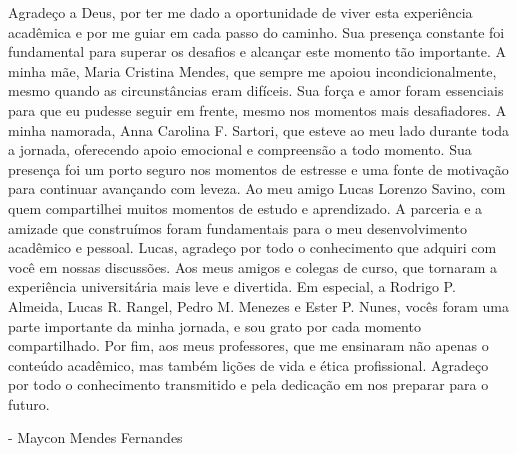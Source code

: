 \begin{agradecimentos}
Agradeço a Deus, por ter me dado a oportunidade de viver esta experiência acadêmica e por me guiar em cada passo do caminho. Sua presença constante foi fundamental para superar os desafios e alcançar este momento tão importante.
A minha mãe, Maria Cristina Mendes, que sempre me apoiou incondicionalmente, mesmo quando as circunstâncias eram difíceis. Sua força e amor foram essenciais para que eu pudesse seguir em frente, mesmo nos momentos mais desafiadores.
A minha namorada, Anna Carolina F. Sartori, que esteve ao meu lado durante toda a jornada, oferecendo apoio emocional e compreensão a todo momento. Sua presença foi um porto seguro nos momentos de estresse e uma fonte de motivação para continuar avançando com leveza.
Ao meu amigo Lucas Lorenzo Savino, com quem compartilhei muitos momentos de estudo e aprendizado. A parceria e a amizade que construímos foram fundamentais para o meu desenvolvimento acadêmico e pessoal. Lucas, agradeço por todo o conhecimento que adquiri com você em nossas discussões.
Aos meus amigos e colegas de curso, que tornaram a experiência universitária mais leve e divertida. Em especial, a Rodrigo P. Almeida, Lucas R. Rangel, Pedro M. Menezes e Ester P. Nunes, vocês foram uma parte importante da minha jornada, e sou grato por cada momento compartilhado.
Por fim, aos meus professores, que me ensinaram não apenas o conteúdo acadêmico, mas também lições de vida e ética profissional. Agradeço por todo o conhecimento transmitido e pela dedicação em nos preparar para o futuro.
\begin{flushright}
- Maycon Mendes Fernandes
\end{flushright}

\end{agradecimentos}



